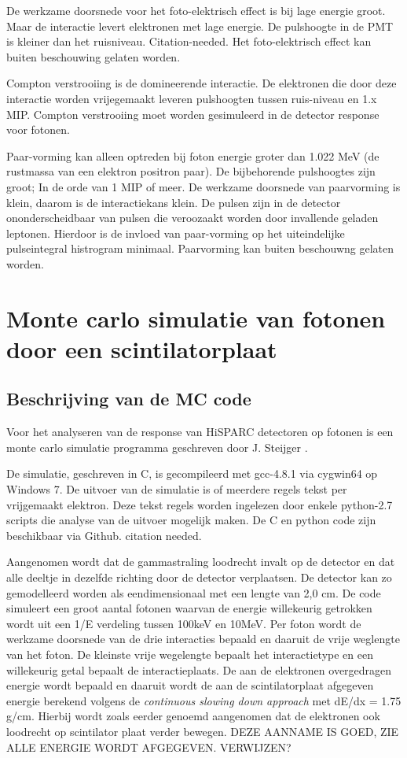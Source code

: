 \documentclass[a4paper,11pt]{article}
\begin{document}
De werkzame doorsnede voor het foto-elektrisch effect is bij lage energie groot. Maar de interactie levert elektronen met lage energie. De pulshoogte in de PMT is kleiner dan het ruisniveau. Citation-needed. Het foto-elektrisch effect kan buiten beschouwing gelaten worden.

Compton verstrooiing is de domineerende interactie. De elektronen die door deze interactie worden vrijegemaakt leveren pulshoogten tussen ruis-niveau en 1.x MIP. Compton verstrooiing moet worden gesimuleerd in de detector response voor fotonen.

Paar-vorming kan alleen optreden bij foton energie groter dan 1.022 MeV (de rustmassa van een elektron positron paar). De bijbehorende pulshoogtes zijn groot; In de orde van 1 MIP of meer. De werkzame doorsnede van paarvorming is klein, daarom is de interactiekans klein. De pulsen zijn in de detector ononderscheidbaar van pulsen die veroozaakt worden door invallende geladen leptonen. Hierdoor is de invloed van paar-vorming op het uiteindelijke pulseintegral histrogram minimaal. Paarvorming kan buiten beschouwng gelaten worden.


\section{Monte carlo simulatie van fotonen door een scintilatorplaat}

\subsection{Beschrijving van de MC code}
Voor het analyseren van de response van HiSPARC detectoren op fotonen is een monte carlo simulatie programma geschreven door J. Steijger \citep*{Steijger2010-gammas}.

De simulatie, geschreven in C, is gecompileerd met gcc-4.8.1 via cygwin64 op Windows 7. De uitvoer van de simulatie is of meerdere regels tekst per vrijgemaakt elektron. Deze tekst regels worden ingelezen door enkele python-2.7 scripts die analyse van de uitvoer mogelijk maken. De C en python code zijn beschikbaar via Github. citation needed.

Aangenomen wordt dat de gammastraling loodrecht invalt op de detector en dat alle deeltje in dezelfde richting door de detector verplaatsen. De detector kan zo gemodelleerd worden als eendimensionaal met een lengte van 2,0 cm. De code simuleert een groot aantal fotonen waarvan de energie willekeurig getrokken wordt uit een 1/E verdeling tussen 100keV en 10MeV. Per foton wordt de werkzame doorsnede van de drie interacties bepaald en daaruit de vrije weglengte van het foton. De kleinste vrije wegelengte bepaalt het interactietype en een willekeurig getal bepaalt de interactieplaats. De aan de elektronen overgedragen energie wordt bepaald en daaruit wordt de aan de scintilatorplaat afgegeven energie berekend volgens de \textit{continuous slowing down approach} met dE/dx = 1.75 g/cm. Hierbij wordt zoals eerder genoemd aangenomen dat de elektronen ook loodrecht op scintilator plaat verder bewegen. DEZE AANNAME IS GOED, ZIE ALLE ENERGIE WORDT AFGEGEVEN. VERWIJZEN?
\end{document}
